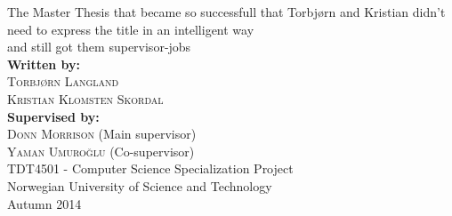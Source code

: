 \documentclass[a4paper]{report}
\begin{document}
\begin{titlepage}
	\begin{center}
		{\huge The Master Thesis that became so successfull that Torbjørn and Kristian didn't need to express the title in an intelligent way}\\[0.5cm]
		{\large and still got them supervisor-jobs}\\[5cm]

		\textbf{Written by:}\\
		\textsc{Torbjørn Langland}\\
		\textsc{Kristian Klomsten Skordal}\\[3em]
		\textbf{Supervised by:}\\
		\textsc{Donn Morrison} (Main supervisor)\\
		\textsc{Yaman Umuroğlu} (Co-supervisor)\\[1cm]

		\vfill
		{\large TDT4501 - Computer Science Specialization Project}\\[0.2em]
		{\large Norwegian University of Science and Technology}\\[0.2em]
		{Autumn 2014}
	\end{center}
\end{titlepage}



\tableofcontents












\end{document}

